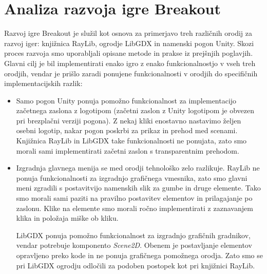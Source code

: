 \documentclass[12pt,a4paper,twoside]{book}
\begin{document}
\chapter{Analiza razvoja igre Breakout}\thispagestyle{fancy}
Razvoj igre Breakout je služil kot osnova za primerjavo treh različnih orodij za razvoj iger: knjižnica RayLib, ogrodje LibGDX in namenski pogon Unity. Skozi proces razvoja smo uporabljali opisane metode in prakse iz prejšnjih poglavjih. Glavni cilj je bil implementirati enako igro z enako funkcionalnostjo v vseh treh orodjih, vendar je prišlo zaradi ponujene funkcionalnosti v orodjih do specifičnih implementacijskih razlik:
\begin{itemize}
	\item Samo pogon Unity ponuja pomožno funkcionalnost za implementacijo začetnega zaslona z logotipom (začetni zaslon z Unity logotipom je obvezen pri brezplačni verziji pogona). Z nekaj kliki enostavno nastavimo željen osebni logotip, nakar pogon poskrbi za prikaz in prehod med scenami. Knjižnica RayLib in LibGDX take funkcionalnosti ne ponujata, zato smo morali sami implementirati začetni zaslon s transparentnim prehodom.
	\item Izgradnja glavnega menija se med orodji tehnološko zelo razlikuje. RayLib ne ponuja funkcionalnosti za izgradnjo grafičnega vmesnika, zato smo glavni meni zgradili s postavitvijo namenskih slik za gumbe in druge elemente. Tako smo morali sami paziti na pravilno postavitev elementov in prilagajanje po zaslonu. Klike na elemente smo morali ročno implementirati z zaznavanjem klika in položaja miške ob kliku.
	
	LibGDX ponuja pomožno funkcionalnost za izgradnjo grafičnih gradnikov, vendar potrebuje komponento \textit{Scene2D}. Obenem je postavljanje elementov opravljeno preko kode in ne ponuja grafičnega pomožnega orodja. Zato smo se pri LibGDX ogrodju odločili za podoben postopek kot pri knjižnici RayLib.
	

\end{itemize}
\end{document}
